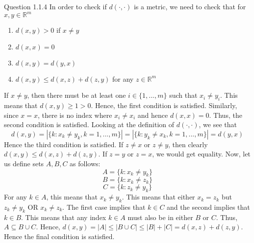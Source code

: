 \documentclass[12pt]{exam}
\begin{document}
\begin{questions}
\question Question 1.1.4\newline
In order to check if $d(\cdot, \cdot)$ is a metric, we need to check that for $x,y \in \mathbb{R}^m$ \begin{enumerate}
    \item $d(x,y) > 0$ if $x \neq y$ 
    \item $d(x,x) = 0$
    \item $d(x,y) = d(y,x)$
    \item $d(x,y) \leq d(x,z) + d(z,y)$ for any $z\in \mathbb{R}^m$
\end{enumerate}
If $x\neq y$, then there must be at least one $i \in \{1,...,m\}$ such that $x_i \neq y_i$. This means that $d(x,y) \geq 1 > 0$. Hence, the first condition is satisfied. Similarly, since $x = x$, there is no index where $x_i \neq x_i$ and hence $d(x,x) = 0$. Thus, the second condition is satisfied. Looking at the definition of $d(\cdot, \cdot)$, we see that \[ d(x,y) = |\{k:x_k \neq y_k, k = 1,...,m\}| = |\{k:y_k \neq x_k, k = 1,...,m\}| = d(y,x)\] Hence the third condition is satisfied. If $z\neq x$ or $z\neq y$, then clearly $d(x,y) \leq d(x,z) + d(z,y)$. If $z=y$ or $z=x$, we would get equality. Now, let us define sets $A, B, C$ as follows:
\[A = \{k : x_k \neq y_k\}\]
\[B = \{k : x_k \neq z_k\}\]
\[C = \{k : z_k \neq y_k\}\]
For any $k\in A$, this means that $x_k \neq y_k$. This means that either $x_k = z_k$ but $z_k \neq y_k$ OR $x_k \neq z_k$. The first case implies that $k \in C$ and the second implies that $k\in B$. This means that any index $k\in A$ must also be in either $B$ or $C$. Thus, $A \subseteq B\cup C$. Hence, $d(x,y) = |A|\leq |B\cup C| \leq |B|+|C| = d(x,z) + d(z,y)$. Hence the final condition is satisfied. 


\end{questions}
\end{document}
